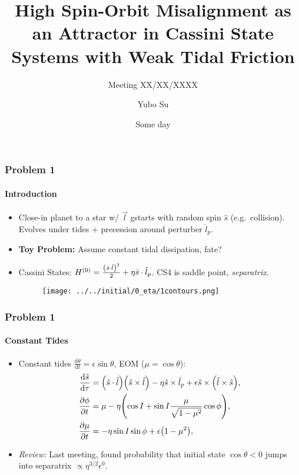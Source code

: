 \documentclass[dvipsnames, 11pt]{beamer}
\newcommand*{\rd}[2]{\frac{\mathrm{d}#1}{\mathrm{d}#2}}
\newcommand*{\pd}[2]{\frac{\partial#1}{\partial#2}}
\DeclarePairedDelimiter\p{\lparen}{\rparen}
\begin{document}
\title[Cassini S-O Misalignment]{High Spin-Orbit Misalignment as an Attractor in
Cassini State Systems with Weak Tidal Friction}
\subtitle{Meeting XX/XX/XXXX}
\author{Yubo Su}
\date{Some day}

\maketitle

\begin{frame}
    \frametitle{Problem 1}
    \framesubtitle{Introduction}

    \begin{itemize}
        \item Close-in planet to a star w/ $\vec{l}$ gstarts with random spin
            $\hat{s}$ (e.g.\ collision). Evolves under tides + precession around
            perturber $\hat{l}_p$.

        \item \textbf{Toy Problem:} Assume constant tidal dissipation, fate?

        \item Cassini States: $H^{(0)} = \frac{\p*{\hat{s} \cdot \hat{l}}^2}{2}
            + \eta \hat{s} \cdot \hat{l}_p$. CS4 is saddle point,
            \emph{separatrix}.

        \begin{figure}[t]
            \centering
            \texttt{[image: ../../initial/0\_eta/1contours.png]}
        \end{figure}
    \end{itemize}
\end{frame}

\begin{frame}
    \frametitle{Problem 1}
    \framesubtitle{Constant Tides}

    \begin{itemize}
        \item Constant tides $\rd{\theta}{t} = \epsilon \sin\theta$,
            EOM ($\mu = \cos \theta$):
            \begin{align*}
                \rd{\hat{s}}{\tau}
                    &= \p*{\hat{s} \cdot \hat{l}}\p*{\hat{s} \times \hat{l}}
                        - \eta\hat{s} \times \hat{l}_p +
                        \epsilon \hat{s} \times \p*{\hat{l} \times \hat{s}}
                        ,\\
                \pd{\phi}{t} &= \mu - \eta
                    \p*{\cos I + \sin I \frac{\mu}{\sqrt{1 - \mu^2}}
                        \cos \phi},\\
                \pd{\mu}{t} &= -\eta \sin I \sin \phi
                    + \epsilon \p*{1 - \mu^2},
            \end{align*}

        \item \emph{Review:} Last meeting, found probability that initial state
            $\cos\theta < 0$ jumps into separatrix $\propto
            \eta^{3/2}\epsilon^0$.
    \end{itemize}
\end{frame}
\end{document}
